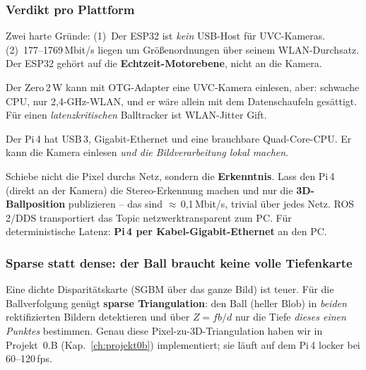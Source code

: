 \subsubsection{Verdikt pro Plattform}
\begin{description}[style=nextline,leftmargin=1.4em]
\item[ESP32 -- nein.] Zwei harte Gründe: (1)~Der ESP32 ist \emph{kein}
  USB-Host für UVC-Kameras. (2)~177--1769\,Mbit/s liegen um Größenordnungen
  über seinem WLAN-Durchsatz. Der ESP32 gehört auf die
  \textbf{Echtzeit-Motorebene}, nicht an die Kamera.
\item[Pi Zero -- technisch möglich, aber schlechte Idee.] Der Zero\,2\,W kann
  mit OTG-Adapter eine UVC-Kamera einlesen, aber: schwache CPU, nur
  2{,}4-GHz-WLAN, und er wäre allein mit dem Datenschaufeln gesättigt. Für
  einen \emph{latenzkritischen} Balltracker ist WLAN-Jitter Gift.
\item[Pi\,4 -- ja, und das ist der richtige Ansatz.] Der Pi\,4 hat USB\,3,
  Gigabit-Ethernet und eine brauchbare Quad-Core-CPU. Er kann die Kamera
  einlesen \emph{und die Bildverarbeitung lokal machen}.
\end{description}
\begin{infobox}[title={Das richtige Muster: am Rand rechnen, nur das Ergebnis senden}]
Schiebe nicht die Pixel durchs Netz, sondern die \textbf{Erkenntnis}. Lass den
Pi\,4 (direkt an der Kamera) die Stereo-Erkennung machen und nur die
\textbf{3D-Ballposition} publizieren -- das sind $\approx$\,0{,}1\,Mbit/s,
trivial über jedes Netz. ROS\,2/DDS transportiert das Topic
netzwerktransparent zum PC. Für deterministische Latenz: \textbf{Pi\,4 per
Kabel-Gigabit-Ethernet} an den PC.
\end{infobox}

\subsubsection{Sparse statt dense: der Ball braucht keine volle Tiefenkarte}
Eine dichte Disparitätskarte (SGBM über das ganze Bild) ist teuer. Für die
Ballverfolgung genügt \textbf{sparse Triangulation}: den Ball (heller Blob) in
\emph{beiden} rektifizierten Bildern detektieren und über $Z=fb/d$ nur die Tiefe
\emph{dieses einen Punktes} bestimmen. Genau diese Pixel-zu-3D-Triangulation
haben wir in Projekt~0.B (Kap.~\ref{ch:projekt0b}) implementiert; sie läuft auf
dem Pi\,4 locker bei 60--120\,fps.

